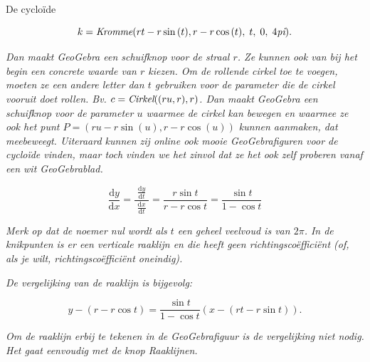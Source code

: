 \begin{lesactiviteit}{De cycloïde}
\begin{vraagenantwoord}
    
    
    \emph{$$k=\emph{Kromme}(r t - r \sin{(t)}, r - r \cos{(t)},\;t,\;0,\;4\emph{pi}).$$}
    
    \emph{Dan maakt GeoGebra een schuifknop voor de straal $r$. Ze kunnen ook van bij het begin een concrete waarde van $r$ kiezen. Om de rollende cirkel toe te voegen, moeten ze een andere letter dan $t$ gebruiken voor de parameter die de cirkel vooruit doet rollen. Bv. $c=\emph{Cirkel} ((r u, r), r)$. Dan maakt GeoGebra een schuifknop voor de parameter $u$ waarmee de cirkel kan bewegen en waarmee ze ook het punt $P=(r u - r \sin{(u)},r-r\cos{(u)})$ kunnen aanmaken, dat meebeweegt. Uiteraard kunnen zij online ook mooie GeoGebrafiguren voor de cycloïde vinden, maar toch vinden we het zinvol dat ze het ook zelf proberen vanaf een wit GeoGebrablad.}
    
    
    
    $$
    \dfrac{\mathrm{d}y}{\mathrm{d}x}=\frac{\;\frac{\mathrm{d}y}{\mathrm{d}t}\;}{\frac{\mathrm{d}x}{\mathrm{d}t}}=\frac{r\sin{t}}{r-r\cos{t}}=\frac{\sin{t}}{1-\cos{t}}
    $$
    
    \emph{Merk op dat de noemer nul wordt als $t$ een geheel veelvoud is van $2\pi$. In de knikpunten is er een verticale raaklijn en die heeft geen richtingscoëfficiënt (of, als je wilt, richtingscoëfficiënt oneindig).}
    
    \emph{De vergelijking van de raaklijn is bijgevolg:}
    
    $$
    y-(r-r\cos{t})=\frac{\sin{t}}{1-\cos{t}}\left(x-(rt-r\sin{t})\right).
    $$
    
    \emph{Om de raaklijn erbij te tekenen in de GeoGebrafiguur is de vergelijking niet nodig. Het gaat eenvoudig met de knop Raaklijnen.}
    
    \end{vraagenantwoord}
    

\end{lesactiviteit}

